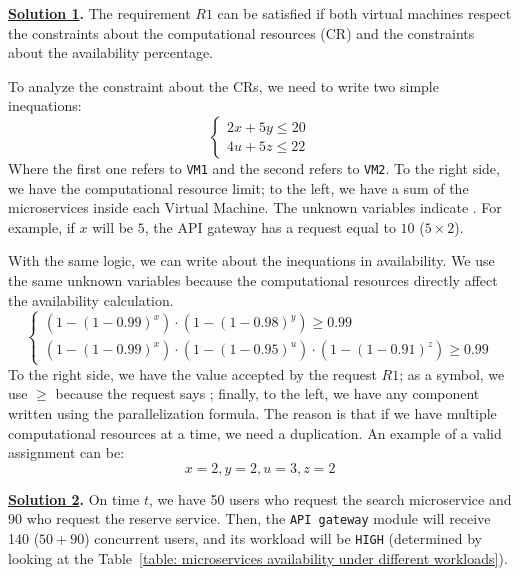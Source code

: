 \solution
\textbf{\underline{Solution 1}.} The requirement $R1$ can be satisfied if both virtual machines respect the constraints about the computational resources (CR) and the constraints about the availability percentage. 

To analyze the constraint about the CRs, we need to write two simple inequations:
\begin{equation*}
    \begin{cases}
        2x + 5y \le 20 \\
        4u + 5z \le 22
    \end{cases}
\end{equation*}
Where the first one refers to \texttt{VM1} and the second refers to \texttt{VM2}. To the right side, we have the computational resource limit; to the left, we have a sum of the microservices inside each Virtual Machine. The unknown variables indicate . For example, if $x$ will be $5$, the API gateway has a request equal to $10$ ($5 \times 2$).

With the same logic, we can write about the inequations in availability. We use the same unknown variables because the computational resources directly affect the availability calculation.
\begin{equation*}
    \begin{cases}
        \left(1-\left(1-0.99\right)^{x}\right) \cdot \left(1-\left(1-0.98\right)^{y}\right) \ge 0.99 \\
        \left(1-\left(1-0.99\right)^{x}\right) \cdot \left(1-\left(1-0.95\right)^{u}\right) \cdot \left(1-\left(1-0.91\right)^{z}\right) \ge 0.99
    \end{cases}
\end{equation*}
To the right side, we have the value accepted by the request $R1$; as a symbol, we use $\ge$ because the request says ; finally, to the left, we have any component written using the parallelization formula. The reason is that if we have multiple computational resources at a time, we need a duplication. An example of a valid assignment can be:
\begin{equation*}
    x = 2, y = 2, u = 3, z = 2
\end{equation*}

\highspace
\textbf{\underline{Solution 2}.} On time $t$, we have 50 users who request the search microservice and 90 who request the reserve service. Then, the \texttt{API gateway} module will receive 140 ($50 + 90$) concurrent users, and its workload will be \texttt{HIGH} (determined by looking at the Table~\ref{table: microservices availability under different workloads}).

